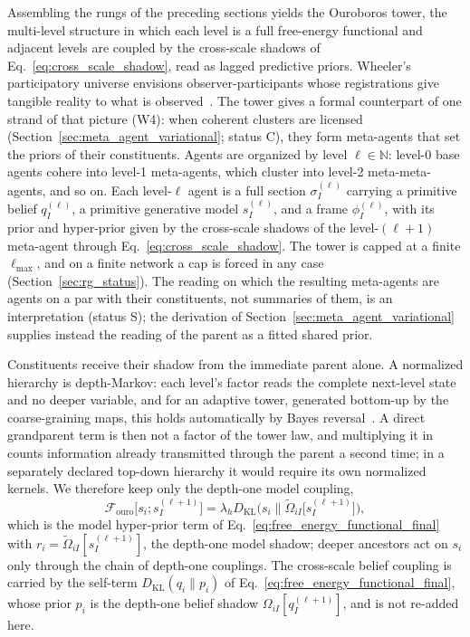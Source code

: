 \documentclass[11pt]{article}
\begin{document}
Assembling the rungs of the preceding sections yields the Ouroboros tower, the multi-level structure in which each level is a full free-energy functional and adjacent levels are coupled by the cross-scale shadows of Eq.~\eqref{eq:cross_scale_shadow}, read as lagged predictive priors. Wheeler's participatory universe envisions observer-participants whose registrations give tangible reality to what is observed~\cite{Wheeler1983, Wheeler1990}. The tower gives a formal counterpart of one strand of that picture (W4): when coherent clusters are licensed (Section~\ref{sec:meta_agent_variational}; status C), they form meta-agents that set the priors of their constituents. Agents are organized by level $\ell \in \mathbb{N}$: level-0 base agents cohere into level-1 meta-agents, which cluster into level-2 meta-meta-agents, and so on. Each level-$\ell$ agent is a full section $\sigma_I^{(\ell)}$ carrying a primitive belief $q_I^{(\ell)}$, a primitive generative model $s_I^{(\ell)}$, and a frame $\phi_I^{(\ell)}$, with its prior and hyper-prior given by the cross-scale shadows of the level-$(\ell+1)$ meta-agent through Eq.~\eqref{eq:cross_scale_shadow}. The tower is capped at a finite $\ell_{\max}$, and on a finite network a cap is forced in any case (Section~\ref{sec:rg_status}). The reading on which the resulting meta-agents are agents on a par with their constituents, not summaries of them, is an interpretation (status S); the derivation of Section~\ref{sec:meta_agent_variational} supplies instead the reading of the parent as a fitted shared prior.

Constituents receive their shadow from the immediate parent alone. A normalized hierarchy is depth-Markov: each level's factor reads the complete next-level state and no deeper variable, and for an adaptive tower, generated bottom-up by the coarse-graining maps, this holds automatically by Bayes reversal~\cite[Ch.~12]{DennisGaugeVFE2026}. A direct grandparent term is then not a factor of the tower law, and multiplying it in counts information already transmitted through the parent a second time; in a separately declared top-down hierarchy it would require its own normalized kernels. We therefore keep only the depth-one model coupling,
\begin{equation}
\mathcal{F}_{\mathrm{ouro}}\big[s_i; s_I^{(\ell+1)}\big] = \lambda_h D_{\mathrm{KL}}\big(s_i \big\| \tilde\Omega_{iI}\big[s_I^{(\ell+1)}\big]\big),
\label{eq:ouroboros_F}
\end{equation}
which is the model hyper-prior term of Eq.~\eqref{eq:free_energy_functional_final} with $r_i = \tilde\Omega_{iI}[s_I^{(\ell+1)}]$, the depth-one model shadow; deeper ancestors act on $s_i$ only through the chain of depth-one couplings. The cross-scale belief coupling is carried by the self-term $D_{\mathrm{KL}}(q_i \| p_i)$ of Eq.~\eqref{eq:free_energy_functional_final}, whose prior $p_i$ is the depth-one belief shadow $\Omega_{iI}[q_I^{(\ell+1)}]$, and is not re-added here.
\end{document}
